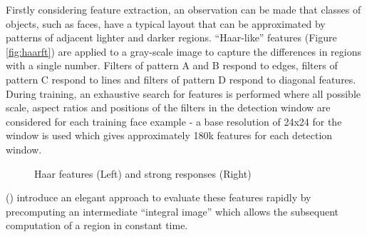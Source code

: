 \documentclass[a4paper,twoside,12pt]{report}
\begin{document}
Firstly considering feature extraction, an observation can be made that classes of objects, such as faces, have a typical layout that can be approximated by patterns of adjacent lighter and darker regions. ``Haar-like'' features (Figure \ref{fig:haarft}) are applied to a gray-scale image to capture the differences in regions with a single number. Filters of pattern A and B respond to edges, filters of pattern C respond to lines and filters of pattern D respond to diagonal features. During training, an exhaustive search for features is performed where all possible scale, aspect ratios and positions of the filters in the detection window are considered for each training face example - a base resolution of 24x24 for the window is used which gives approximately 180k features for each detection window. 

\begin{figure}[h!]
    \centering
    \qquad
    \caption{Haar features \cite{vjdet} (Left) and strong responses (Right)}
\end{figure}

\citeauthor{vjdet} (\citeyear{vjdet}) introduce an elegant approach to evaluate these features rapidly by precomputing an intermediate ``integral image'' which allows the subsequent computation of a region in constant time. 
\end{document}
